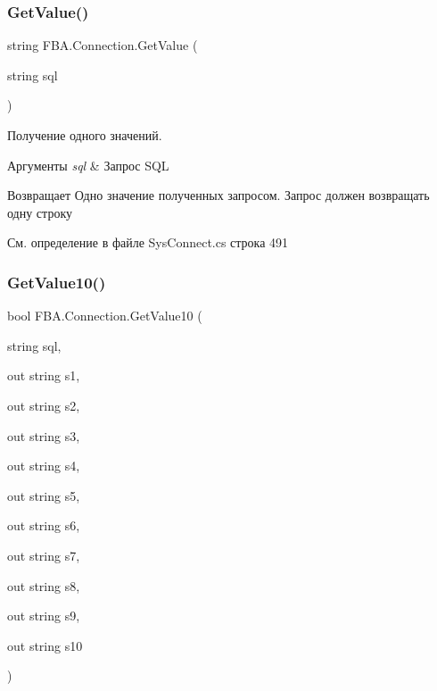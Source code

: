 \subsubsection{\texorpdfstring{Get\+Value()}{GetValue()}}
{\footnotesize\ttfamily string F\+B\+A.\+Connection.\+Get\+Value (\begin{DoxyParamCaption}\item[{string}]{sql }\end{DoxyParamCaption})}



Получение одного значений. 


\begin{DoxyParams}{Аргументы}
{\em sql} & Запрос S\+QL\\
\hline
\end{DoxyParams}
\begin{DoxyReturn}{Возвращает}
Одно значение полученных запросом. Запрос должен возвращать одну строку
\end{DoxyReturn}


См. определение в файле Sys\+Connect.\+cs строка 491

\mbox{\label{class_f_b_a_1_1_connection_acc4bb0104ca9cb3f480999e5ab9a3116}} 
\subsubsection{\texorpdfstring{Get\+Value10()}{GetValue10()}}
{\footnotesize\ttfamily bool F\+B\+A.\+Connection.\+Get\+Value10 (\begin{DoxyParamCaption}\item[{string}]{sql,  }\item[{out string}]{s1,  }\item[{out string}]{s2,  }\item[{out string}]{s3,  }\item[{out string}]{s4,  }\item[{out string}]{s5,  }\item[{out string}]{s6,  }\item[{out string}]{s7,  }\item[{out string}]{s8,  }\item[{out string}]{s9,  }\item[{out string}]{s10 }\end{DoxyParamCaption})}



